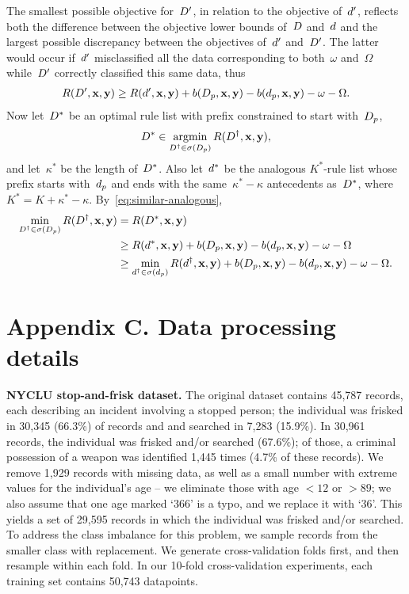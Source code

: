 %
The smallest possible objective for~${D}'$, in relation
to the objective of~${d}'$, reflects both the difference
between the objective lower bounds of~${D}$ and~${d}$
and the largest possible discrepancy between the
objectives of~${d}'$ and~${D}'$.
%
The latter would occur if~${d}'$ misclassified all the data
corresponding to both~$\omega$ and~$\Omega$ while~${D}'$
correctly classified this same data, thus
\begin{align}
R({D}', \mathbf{x}, \mathbf{y}) \ge R({d}', \mathbf{x}, \mathbf{y})
  + b(D_p, \mathbf{x}, \mathbf{y}) - b(d_p, \mathbf{x}, \mathbf{y}) - \omega - \Omega.
\label{eq:similar-analogous}
\end{align}
%
Now let~${D}^*$ be an optimal rule list with prefix
constrained to start with~$D_p$,
\begin{align*}
{D}^* \in \operatorname*{argmin}_{{D}^\dagger \in \sigma(D_p)} R({D}^\dagger, \mathbf{x}, \mathbf{y}),
\end{align*}
and let~$\kappa^*$ be the length of~${D}^*$.
%
Also let~${d}^*$ be the analogous $K^*$-rule list whose prefix
starts with~$d_p$ and ends with the same~${\kappa^* - \kappa}$
antecedents as~${D}^*$, where~${K^* = K + \kappa^* - \kappa}$.
%
By~\eqref{eq:similar-analogous},
\begin{align*}
\min_{{D}^\dagger \in \sigma(D_p)} R({D}^\dagger, \mathbf{x}, \mathbf{y})
&= R({D}^*, \mathbf{x}, \mathbf{y}) \\
&\ge R({d}^*, \mathbf{x}, \mathbf{y})
  + b(D_p, \mathbf{x}, \mathbf{y}) - b(d_p, \mathbf{x}, \mathbf{y}) - \omega - \Omega \\
&\ge \min_{{d}^\dagger \in \sigma(d_p)} R({d}^\dagger, \mathbf{x}, \mathbf{y})
  + b(D_p, \mathbf{x}, \mathbf{y}) - b(d_p, \mathbf{x}, \mathbf{y}) - \omega - \Omega.
\end{align*}

\section*{Appendix C. Data processing details}

\textbf{NYCLU stop-and-frisk dataset.} The original dataset contains 45,787 records,
each describing an incident involving a stopped person; the individual
was frisked in 30,345 (66.3\%) of records and and searched in 7,283 (15.9\%).
%
In 30,961 records, the individual was frisked and/or searched (67.6\%); of those,
a criminal possession of a weapon was identified 1,445 times (4.7\% of these records).
%
We remove 1,929 records with missing data, as well as a small number with extreme values
for the individual's age -- we eliminate those with age $< 12$ or $>89$;
we also assume that one age marked `366' is a typo, and we replace it with `36'.
%
This yields a set of 29,595 records in which the individual was frisked and/or searched.
%
To address the class imbalance for this problem, we sample records from the
smaller class with replacement.
%
We generate cross-validation folds first, and then resample within each fold.
%
In our 10-fold cross-validation experiments, each training set contains 50,743 datapoints.

